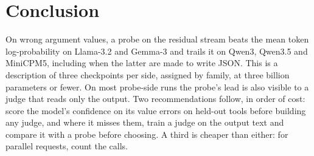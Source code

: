 \section{Conclusion}
\label{sec:conclusion}

On wrong argument values, a probe on the residual stream beats the mean token log-probability on Llama-3.2 and Gemma-3 and trails it on Qwen3, Qwen3.5 and MiniCPM5, including when the latter are made to write JSON. This is a description of three checkpoints per side, assigned by family, at three billion parameters or fewer. On most probe-side runs the probe's lead is also visible to a judge that reads only the output. Two recommendations follow, in order of cost: score the model's confidence on its value errors on held-out tools before building any judge, and where it misses them, train a judge on the output text and compare it with a probe before choosing. A third is cheaper than either: for parallel requests, count the calls.
